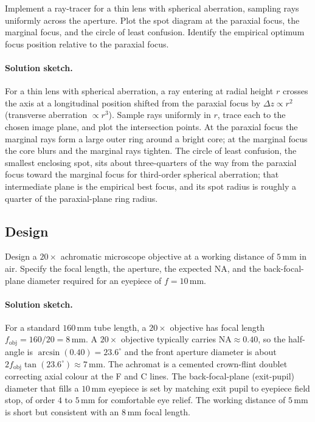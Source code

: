 \begin{exercise}
Implement a ray-tracer for a thin lens with spherical aberration,
sampling rays uniformly across the aperture. Plot the spot diagram
at the paraxial focus, the marginal focus, and the circle of least
confusion. Identify the empirical optimum focus position relative to
the paraxial focus.
\paragraph{Solution sketch.} For a thin lens with spherical aberration,
a ray entering at radial height $r$ crosses the axis at a longitudinal
position shifted from the paraxial focus by $\Delta z \propto r^{2}$
(transverse aberration $\propto r^{3}$). Sample rays uniformly in $r$,
trace each to the chosen image plane, and plot the intersection points.
At the paraxial focus the marginal rays form a large outer ring around a
bright core; at the marginal focus the core blurs and the marginal rays
tighten. The circle of least confusion, the smallest enclosing spot,
sits about three-quarters of the way from the paraxial focus toward the
marginal focus for third-order spherical aberration; that intermediate
plane is the empirical best focus, and its spot radius is roughly a
quarter of the paraxial-plane ring radius.
\end{exercise}

\subsection*{Design}

\begin{exercise}
Design a $20\times$ achromatic microscope objective at a working
distance of $5\,\si{\milli\meter}$ in air. Specify the focal length,
the aperture, the expected NA, and the back-focal-plane diameter
required for an eyepiece of $f = 10\,\si{\milli\meter}$.
\paragraph{Solution sketch.} For a standard $160\,\si{\milli\meter}$
tube length, a $20\times$ objective has focal length
$f_{\text{obj}} = 160/20 = 8\,\si{\milli\meter}$. A $20\times$ objective
typically carries $\text{NA} \approx 0.40$, so the half-angle is
$\arcsin(0.40) = 23.6^{\circ}$ and the front aperture diameter is about
$2 f_{\text{obj}}\tan(23.6^{\circ}) \approx 7\,\si{\milli\meter}$. The
achromat is a cemented crown-flint doublet correcting axial colour at
the F and C lines. The back-focal-plane (exit-pupil) diameter that fills
a $10\,\si{\milli\meter}$ eyepiece is set by matching exit pupil to
eyepiece field stop, of order $4$ to $5\,\si{\milli\meter}$ for
comfortable eye relief. The working distance of $5\,\si{\milli\meter}$
is short but consistent with an $8\,\si{\milli\meter}$ focal length.
\end{exercise}

